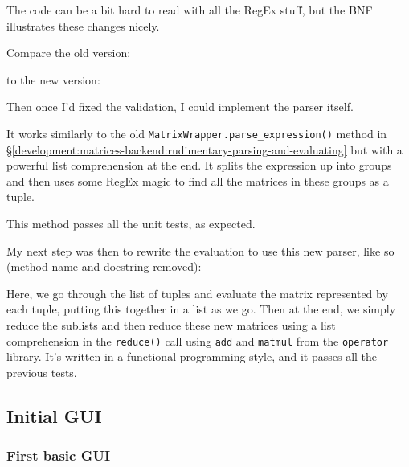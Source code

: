 \documentclass[../main.tex]{subfiles}
\begin{document}

The code can be a bit hard to read with all the RegEx stuff, but the BNF illustrates these changes nicely.

Compare the old version:


to the new version:


Then once I'd fixed the validation, I could implement the parser itself.


It works similarly to the old \texttt{MatrixWrapper.parse\_expression()} method in \S\ref{development:matrices-backend:rudimentary-parsing-and-evaluating} but with a powerful list comprehension at the end. It splits the expression up into groups and then uses some RegEx magic to find all the matrices in these groups as a tuple.

This method passes all the unit tests, as expected.

My next step was then to rewrite the evaluation to use this new parser, like so (method name and docstring removed):


Here, we go through the list of tuples and evaluate the matrix represented by each tuple, putting this together in a list as we go. Then at the end, we simply reduce the sublists and then reduce these new matrices using a list comprehension in the \texttt{reduce()} call using \texttt{add} and \texttt{matmul} from the \texttt{operator} library. It's written in a functional programming style, and it passes all the previous tests.

\subsection{Initial GUI\label{development:initial-gui}}

\subsubsection{First basic GUI\label{development:initial-gui:first-basic-gui}}
\end{document}
